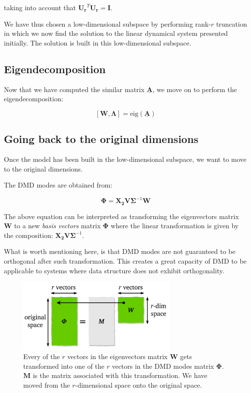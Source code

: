 \documentclass[10pt,twocolumn]{article}
\begin{document}
taking into account that $\bm{U_r}^T \bm{U_r} = \bm{I}$.

We have thus chosen a low-dimensional subspace by performing rank-$r$ truncation in which we now find the solution to the linear dynamical system presented initially. The solution is built in this low-dimensional subspace.

\subsection{Eigendecomposition}

Now that we have computed the similar matrix $\underline{\bm{A}}$, we move on to perform the eigendecomposition:

\begin{equation} \label{eq:A_underline}
[\bm{W}, \bm{\Lambda}] = \text{eig}(\underline{\bm{A}})
\end{equation}

\subsection{Going back to the original dimensions}

Once the model has been built in the low-dimensional subspace, we want to move to the original dimensions. 

The DMD modes are obtained from:

\begin{equation} \label{eq:A_underline}
\bm{\Phi} = \bm{X_2} \bm{V} \bm{\Sigma}^{-1} \bm{W}
\end{equation}

The above equation can be interpreted as transforming the eigenvectors matrix $\bm{W}$ to a new \textit{basis vectors} matrix $\bm{\Phi}$ where the linear transformation is given by the composition: $\bm{X_2} \bm{V} \bm{\Sigma}^{-1}$.

What is worth mentioning here, is that DMD modes are not guaranteed to be orthogonal after such transformation. This creates a great capacity of DMD to be applicable to systems where data structure does not exhibit orthogonality.

\begin{figure}[H]
\centering\includegraphics[width=8cm]{dmd-modes-transformation.png}
\caption{Every of the $r$ vectors in the eigenvectors matrix $\bm{W}$ gets transformed into one of the $r$ vectors in the DMD modes matrix $\bm{\Phi}$. $\bm{M}$ is the matrix associated with this transformation. We have moved from the $r$-dimensional space onto the original space.}
\label{fig:linear_system}
\end{figure}
\end{document}
